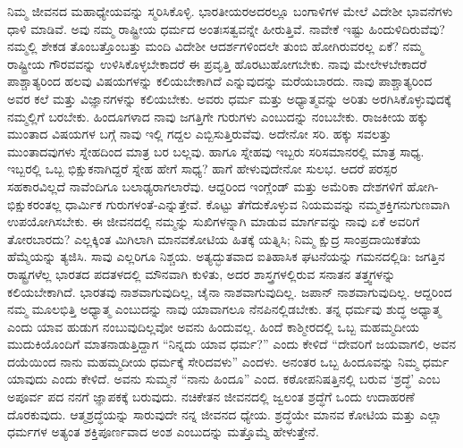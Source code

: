 ನಿಮ್ಮ ಜೀವನದ ಮಹಾಧ್ಯೇಯವನ್ನು ಸ್ಮರಿಸಿಕೊಳ್ಳಿ. ಭಾರತೀಯರ\break ಅದರಲ್ಲೂ ಬಂಗಾಳಿಗಳ ಮೇಲೆ ವಿದೇಶೀ ಭಾವನೆಗಳು ಧಾಳಿ ಮಾಡಿವೆ. ಅವು ನಮ್ಮ ರಾಷ್ಟ್ರೀಯ ಧರ್ಮದ ಅಂತಃಸತ್ವವನ್ನೇ ಹೀರುತ್ತಿವೆ. ನಾವೇಕೆ ಇಷ್ಟು ಹಿಂದುಳಿದಿರುವೆವು? ನಮ್ಮಲ್ಲಿ ಶೇಕಡ ತೊಂಬತ್ತೊಂಬತ್ತು ಮಂದಿ ವಿದೇಶೀ ಆದರ್ಶಗಳಿಂದಲೇ ತುಂಬಿ ಹೋಗಿರುವರಲ್ಲ ಏಕೆ? ನಮ್ಮ ರಾಷ್ಟ್ರೀಯ ಗೌರವವನ್ನು ಉಳಿಸಿಕೊಳ್ಳಬೇಕಾದರೆ ಈ ಪ್ರವೃತ್ತಿ ಹೊರಟುಹೋಗಬೇಕು. ನಾವು ಮೇಲೇಳಬೇಕಾದರೆ ಪಾಶ್ಚಾತ್ಯರಿಂದ ಹಲವು ವಿಷಯಗಳನ್ನು ಕಲಿಯಬೇಕಾಗಿದೆ ಎನ್ನುವುದನ್ನು ಮರೆಯಬಾರದು. ನಾವು ಪಾಶ್ಚಾತ್ಯರಿಂದ ಅವರ ಕಲೆ ಮತ್ತು ವಿಜ್ಞಾನಗಳನ್ನು ಕಲಿಯಬೇಕು. ಅವರು ಧರ್ಮ ಮತ್ತು ಅಧ್ಯಾತ್ಮವನ್ನು ಅರಿತು ಅರಗಿಸಿಕೊಳ್ಳುವುದಕ್ಕೆ ನಮ್ಮಲ್ಲಿಗೆ ಬರಬೇಕು. ಹಿಂದೂಗಳಾದ ನಾವು ಜಗತ್ತಿಗೇ ಗುರುಗಳು ಎಂಬುದನ್ನು ನಂಬಬೇಕು. ರಾಜಕೀಯ ಹಕ್ಕು ಮುಂತಾದ ವಿಷಯಗಳ ಬಗ್ಗೆ ನಾವು ಇಲ್ಲಿ ಗದ್ದಲ ಎಬ್ಬಿಸುತ್ತಿರುವೆವು. ಅದೇನೋ ಸರಿ. ಹಕ್ಕು ಸವಲತ್ತು ಮುಂತಾದವುಗಳು ಸ್ನೇಹದಿಂದ ಮಾತ್ರ ಬರ ಬಲ್ಲವು. ಹಾಗೂ ಸ್ನೇಹವು ಇಬ್ಬರು ಸರಿಸಮಾನರಲ್ಲಿ ಮಾತ್ರ ಸಾಧ್ಯ. ಇಬ್ಬರಲ್ಲಿ ಒಬ್ಬ ಭಿಕ್ಷುಕನಾಗಿದ್ದರೆ ಸ್ನೇಹ ಹೇಗೆ ಸಾಧ್ಯ? ಹಾಗೆ ಹೇಳುವುದೇನೋ ಸುಲಭ. ಆದರೆ ಪರಸ್ಪರ ಸಹಕಾರವಿಲ್ಲದೆ ನಾವೆಂದಿಗೂ ಬಲಾಢ್ಯರಾಗಲಾರೆವು. ಆದ್ದರಿಂದ ಇಂಗ್ಲೆಂಡ್​ ಮತ್ತು ಅಮೆರಿಕಾ ದೇಶಗಳಿಗೆ ಹೋಗಿ-ಭಿಕ್ಷುಕರಂತಲ್ಲ ಧಾರ್ಮಿಕ ಗುರುಗಳಂತೆ-ಎನ್ನುತ್ತೇವೆ. ಕೊಟ್ಟು ತೆಗೆದುಕೊಳ್ಳುವ ನಿಯಮವನ್ನು ನಮ್ಮ\break ಶಕ್ತಿಗನುಗುಣವಾಗಿ ಉಪಯೋಗಿಸಬೇಕು. ಈ ಜೀವನದಲ್ಲಿ ನಮ್ಮನ್ನು ಸುಖಿಗಳನ್ನಾಗಿ ಮಾಡುವ ಮಾರ್ಗವನ್ನು ನಾವು ಏಕೆ ಅವರಿಗೆ ತೋರಬಾರದು? ಎಲ್ಲಕ್ಕಿಂತ ಮಿಗಿಲಾಗಿ ಮಾನವಕೋಟಿಯ ಹಿತಕ್ಕೆ ಯತ್ನಿಸಿ; ನಿಮ್ಮ ಕ್ಷುದ್ರ ಸಾಂಪ್ರದಾಯಿಕತೆಯ ಹೆಮ್ಮೆಯನ್ನು ತ್ಯಜಿಸಿ. ಸಾವು ಎಲ್ಲರಿಗೂ ನಿಶ್ಚಯ. ಅತ್ಯದ್ಭುತವಾದ ಐತಿಹಾಸಿಕ ಘಟನೆಯನ್ನು ಗಮನದಲ್ಲಿಡಿ: ಜಗತ್ತಿನ ರಾಷ್ಟ್ರಗಳೆಲ್ಲ ಭಾರತದ ಪದತಳದಲ್ಲಿ ಮೌನವಾಗಿ ಕುಳಿತು, ಅದರ ಶಾಸ್ತ್ರಗಳಲ್ಲಿರುವ ಸನಾತನ ತತ್ತ್ವಗಳನ್ನು ಕಲಿಯಬೇಕಾಗಿದೆ. ಭಾರತವು ನಾಶವಾಗುವುದಿಲ್ಲ, ಚೈನಾ ನಾಶವಾಗುವುದಿಲ್ಲ. ಜಪಾನ್​ ನಾಶವಾಗುವುದಿಲ್ಲ. ಆದ್ದರಿಂದ ನಮ್ಮ ಮೂಲಭಿತ್ತಿ ಅಧ್ಯಾತ್ಮ ಎಂಬುದನ್ನು ನಾವು ಯಾವಾಗಲೂ ನೆನಪಿನಲ್ಲಿಡಬೇಕು. ತನ್ನ ಧರ್ಮವು ಶುದ್ಧ ಅಧ್ಯಾತ್ಮ ಎಂದು ಯಾವ ಹುಡುಗ ನಂಬುವುದಿಲ್ಲವೋ ಅವನು ಹಿಂದುವಲ್ಲ. ಹಿಂದೆ ಕಾಶ್ಮೀರದಲ್ಲಿ ಒಬ್ಬ ಮಹಮ್ಮದೀಯ ಮುದುಕಿಯೊಂದಿಗೆ ಮಾತನಾಡುತ್ತಿದ್ದಾಗ “ನಿನ್ನದು ಯಾವ ಧರ್ಮ?” ಎಂದು ಕೇಳಿದೆ “ದೇವರಿಗೆ ಜಯವಾಗಲಿ, ಅವನ ದಯೆಯಿಂದ ನಾನು ಮಹಮ್ಮದೀಯ ಧರ್ಮಕ್ಕೆ ಸೇರಿದವಳು” ಎಂದಳು. ಅನಂತರ ಒಬ್ಬ ಹಿಂದೂವನ್ನು ನಿಮ್ಮ ಧರ್ಮ ಯಾವುದು ಎಂದು ಕೇಳಿದೆ. ಅವನು ಸುಮ್ಮನೆ “ನಾನು ಹಿಂದೂ” ಎಂದ. ಕಠೋಪನಿಷತ್ತಿನಲ್ಲಿ ಬರುವ ‘ಶ್ರದ್ಧೆ’ ಎಂಬ ಅಪೂರ್ವ ಪದ ನನಗೆ ಜ್ಞಾಪಕಕ್ಕೆ ಬರುವುದು. ನಚಿಕೇತನ ಜೀವನದಲ್ಲಿ ಜ್ವಲಂತ ಶ್ರದ್ಧೆಗೆ ಒಂದು ಉದಾಹರಣೆ ದೊರಕುವುದು. ಆತ್ಮಶ್ರದ್ಧೆಯನ್ನು ಸಾರುವುದೇ ನನ್ನ ಜೀವನದ ಧ್ಯೇಯ. ಶ್ರದ್ಧೆಯೇ ಮಾನವ ಕೋಟಿಯ ಮತ್ತು ಎಲ್ಲಾ ಧರ್ಮಗಳ ಅತ್ಯಂತ ಶಕ್ತಿಪೂರ್ಣವಾದ ಅಂಶ ಎಂಬುದನ್ನು ಮತ್ತೊಮ್ಮೆ ಹೇಳುತ್ತೇನೆ.

